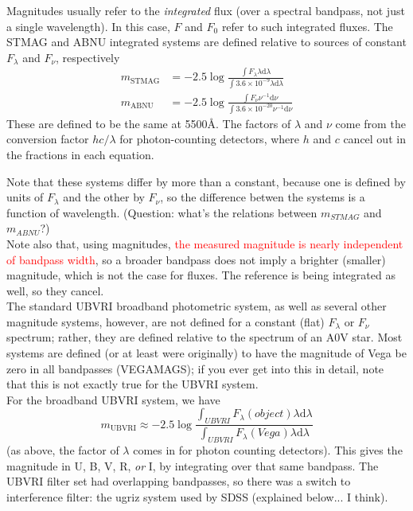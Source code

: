 \documentclass[12pt]{article}
\begin{document}
Magnitudes usually refer to the \emph{integrated} flux (over a
spectral bandpass, not just a single wavelength).
In this case, $F$ and $F_0$ refer to such integrated fluxes.
The STMAG and ABNU integrated systems are defined relative to sources
of constant $F_{\lambda}$ and $F_{\nu}$, respectively
\begin{align*}
    m_{\textrm{STMAG}} &= -2.5 \log \frac{\int F_{\lambda} \lambda
    \textrm{d}\lambda}{\int3.6\times10^{-9}\lambda\textrm{d}\lambda}\\
    m_{\textrm{ABNU}} &= -2.5 \log \frac{\int F_{\nu}\nu^{-1}
\textrm{d}\nu}{\int 3.6 \times 10^{-20}\nu^{-1}\textrm{d}\nu}
\end{align*}
These are defined to be the same at 5500\AA{}.
The factors of $\lambda$ and $\nu$ come from the conversion factor
$hc/\lambda$ for photon-counting detectors, where $h$ and $c$ cancel out in the
fractions in each equation.

Note that these systems differ by more than a constant,
because one is defined by units of $F_{\lambda}$ and the other by $F_{\nu}$,
so the difference betwen the systems is a function of wavelength.
(Question: what's the relations between $m_{STMAG}$ and $m_{ABNU}$?)\\

\noindent Note also that, using magnitudes,
\textcolor{red}{the measured magnitude is
nearly independent of bandpass width}, so a broader bandpass does not
imply a brighter (smaller) magnitude, which is not the case for
fluxes. The reference is being integrated as well, so they cancel.\\

\noindent The standard UBVRI broadband photometric system, as well as
several other magnitude systems, however, are not defined for a
constant (flat) $F_{\lambda}$ or $F_{\nu}$ spectrum; rather, they are defined
relative to the spectrum of an A0V star. Most systems are defined (or
at least were originally) to have the magnitude of Vega be zero in all
bandpasses (VEGAMAGS); if you ever get into this in detail, note that
this is not exactly true for the UBVRI system.\\

\noindent For the broadband UBVRI system, we have
\begin{equation*}
    m_{\textrm{UBVRI}} \approx -2.5 \log
    \frac{\int_{UBVRI}F_{\lambda}(object)\lambda\textrm{d}\lambda}
    {\int_{UBVRI}F_{\lambda}(Vega)\lambda\textrm{d}\lambda}
\end{equation*}
(as above, the factor of $\lambda$ comes in for photon counting
detectors). This gives the magnitude in U, B, V, R, \emph{or} I,
by integrating over that same bandpass.
The UBVRI filter set had overlapping bandpasses, so
there was a switch to interference filter: the ugriz system used
by SDSS (explained below... I think).\\
\end{document}
